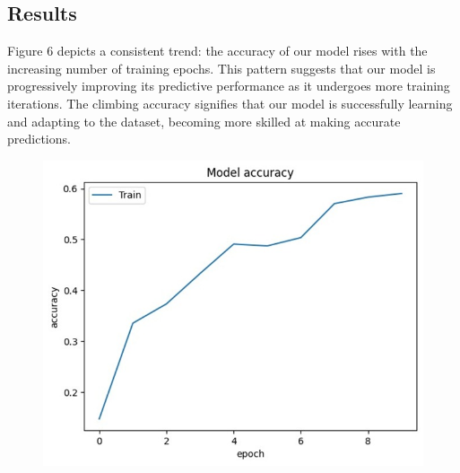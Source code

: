 \documentclass[12pt,a4paper]{article}
\begin{document}
\subsection{Results}

Figure 6 depicts a consistent trend: the accuracy of our model rises with the increasing number of training epochs. This pattern suggests that our model is progressively improving its predictive performance as it undergoes more training iterations. The climbing accuracy signifies that our model is successfully learning and adapting to the dataset, becoming more skilled at making accurate predictions.

\begin{figure}[h]
    \centering
    \includegraphics[width=\linewidth]{images/3.4.1.jpeg}
     
     
     \caption{}     \label{fig:my_label} 
    \end{figure}\\
\end{document}
